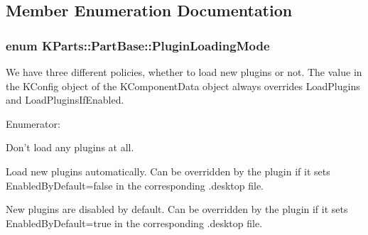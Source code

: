 \subsection{\-Member \-Enumeration \-Documentation}
\hypertarget{classKParts_1_1PartBase_a73b04eba759c3505ac722b2ceaaa8b76}{
\subsubsection[{\-Plugin\-Loading\-Mode}]{\setlength{\rightskip}{0pt plus 5cm}enum {\bf \-K\-Parts\-::\-Part\-Base\-::\-Plugin\-Loading\-Mode}}}\label{classKParts_1_1PartBase_a73b04eba759c3505ac722b2ceaaa8b76}
\-We have three different policies, whether to load new plugins or not. \-The value in the \-K\-Config object of the \-K\-Component\-Data object always overrides \-Load\-Plugins and \-Load\-Plugins\-If\-Enabled. \begin{Desc}
\item[\-Enumerator\-: ]\par
\begin{description}
\item[{\em 
\hypertarget{classKParts_1_1PartBase_a73b04eba759c3505ac722b2ceaaa8b76a3ffe0a5005d5e1d00b4d3fd8c4d51a1e}{\-Do\-Not\-Load\-Plugins}\label{classKParts_1_1PartBase_a73b04eba759c3505ac722b2ceaaa8b76a3ffe0a5005d5e1d00b4d3fd8c4d51a1e}
}]\-Don't load any plugins at all. \item[{\em 
\hypertarget{classKParts_1_1PartBase_a73b04eba759c3505ac722b2ceaaa8b76aeff505f5627f1539e03730d042e39522}{\-Load\-Plugins}\label{classKParts_1_1PartBase_a73b04eba759c3505ac722b2ceaaa8b76aeff505f5627f1539e03730d042e39522}
}]\-Load new plugins automatically. \-Can be overridden by the plugin if it sets \-Enabled\-By\-Default=false in the corresponding .desktop file. \item[{\em 
\hypertarget{classKParts_1_1PartBase_a73b04eba759c3505ac722b2ceaaa8b76aeaf6ca999ef635e22e3f52234226e931}{\-Load\-Plugins\-If\-Enabled}\label{classKParts_1_1PartBase_a73b04eba759c3505ac722b2ceaaa8b76aeaf6ca999ef635e22e3f52234226e931}
}]\-New plugins are disabled by default. \-Can be overridden by the plugin if it sets \-Enabled\-By\-Default=true in the corresponding .desktop file. \end{description}
\end{Desc}
